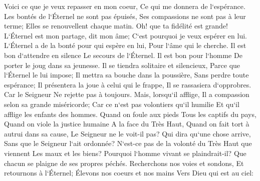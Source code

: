 \verse Voici ce que je veux repasser en mon coeur, Ce qui me donnera de l`espérance. 
\verse Les bontés de l`Éternel ne sont pas épuisés, Ses compassions ne sont pas à leur terme; 
\verse Elles se renouvellent chaque matin. Oh! que ta fidélité est grande! 
\verse L`Éternel est mon partage, dit mon âme; C`est pourquoi je veux espérer en lui. 
\verse L`Éternel a de la bonté pour qui espère en lui, Pour l`âme qui le cherche. 
\verse Il est bon d`attendre en silence Le secours de l`Éternel. 
\verse Il est bon pour l`homme De porter le joug dans sa jeunesse. 
\verse Il se tiendra solitaire et silencieux, Parce que l`Éternel le lui impose; 
\verse Il mettra sa bouche dans la poussière, Sans perdre toute espérance; 
\verse Il présentera la joue à celui qui le frappe, Il se rassasiera d`opprobres. 
\verse Car le Seigneur Ne rejette pas à toujours. 
\verse Mais, lorsqu`il afflige, Il a compassion selon sa grande miséricorde; 
\verse Car ce n`est pas volontiers qu`il humilie Et qu`il afflige les enfants des hommes. 
\verse Quand on foule aux pieds Tous les captifs du pays, 
\verse Quand on viole la justice humaine A la face du Très Haut, 
\verse Quand on fait tort à autrui dans sa cause, Le Seigneur ne le voit-il pas? 
\verse Qui dira qu`une chose arrive, Sans que le Seigneur l`ait ordonnée? 
\verse N`est-ce pas de la volonté du Très Haut que viennent Les maux et les biens? 
\verse Pourquoi l`homme vivant se plaindrait-il? Que chacun se plaigne de ses propres péchés. 
\verse Recherchons nos voies et sondons, Et retournons à l`Éternel; 
\verse Élevons nos coeurs et nos mains Vers Dieu qui est au ciel: 
